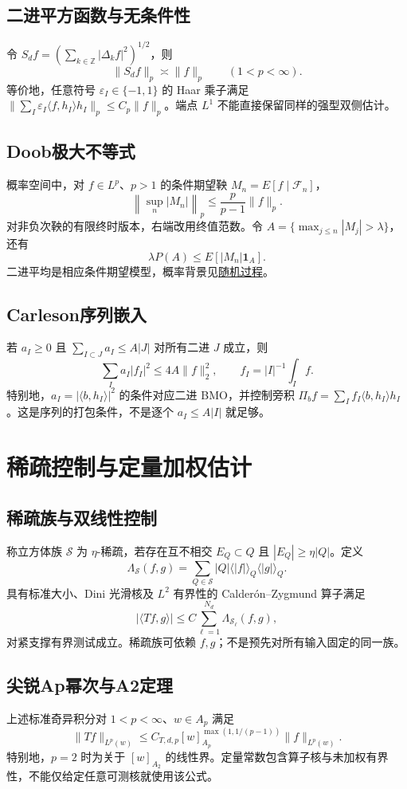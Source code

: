 \documentclass[../main.tex]{subfiles}
\begin{document}
\subsection{二进平方函数与无条件性}
令 $S_df=(\sum_{k\in\mathbb Z}|\Delta_kf|^2)^{1/2}$，则
\[
\|S_df\|_p\asymp\|f\|_p\qquad(1<p<\infty).
\]
等价地，任意符号 $\varepsilon_I\in\{-1,1\}$ 的 Haar 乘子满足 $\|\sum_I\varepsilon_I\langle f,h_I\rangle h_I\|_p\le C_p\|f\|_p$。端点 $L^1$ 不能直接保留同样的强型双侧估计。
\subsection{Doob极大不等式}
概率空间中，对 $f\in L^p$、$p>1$ 的条件期望鞅 $M_n=E[f\mid\mathcal F_n]$，
\[
\left\|\sup_n|M_n|\right\|_p\le\frac p{p-1}\|f\|_p.
\]
对非负次鞅的有限终时版本，右端改用终值范数。令 $A=\{\max_{j\le n}|M_j|>\lambda\}$，还有
\[
\lambda P(A)\le E[|M_n|\bm1_A].
\]
二进平均是相应条件期望模型，概率背景见\hyperref[chap:stochastic-processes]{随机过程}。
\subsection{Carleson序列嵌入}
若 $a_I\ge0$ 且 $\sum_{I\subset J}a_I\le A|J|$ 对所有二进 $J$ 成立，则
\[
\sum_Ia_I|f_I|^2\le4A\|f\|_2^2,\qquad f_I=|I|^{-1}\int_If.
\]
特别地，$a_I=|\langle b,h_I\rangle|^2$ 的条件对应二进 BMO，并控制旁积 $\Pi_bf=\sum_If_I\langle b,h_I\rangle h_I$。这是序列的打包条件，不是逐个 $a_I\le A|I|$ 就足够。
\section{稀疏控制与定量加权估计}
\subsection{稀疏族与双线性控制}
称立方体族 $\mathcal S$ 为 $\eta$-稀疏，若存在互不相交 $E_Q\subset Q$ 且 $|E_Q|\ge\eta|Q|$。定义
\[
\Lambda_{\mathcal S}(f,g)=\sum_{Q\in\mathcal S}|Q|\langle|f|\rangle_Q\langle|g|\rangle_Q.
\]
具有标准大小、Dini 光滑核及 $L^2$ 有界性的 Calderón--Zygmund 算子满足
\[
|\langle Tf,g\rangle|\le C\sum_{\ell=1}^{N_d}\Lambda_{\mathcal S_\ell}(f,g),
\]
对紧支撑有界测试成立。稀疏族可依赖 $f,g$；不是预先对所有输入固定的同一族。
\subsection{尖锐Ap幂次与A2定理}
上述标准奇异积分对 $1<p<\infty$、$w\in A_p$ 满足
\[
\|Tf\|_{L^p(w)}\le C_{T,d,p}[w]_{A_p}^{\max(1,1/(p-1))}\|f\|_{L^p(w)}.
\]
特别地，$p=2$ 时为关于 $[w]_{A_2}$ 的线性界。定量常数包含算子核与未加权有界性，不能仅给定任意可测核就使用该公式。
\end{document}
